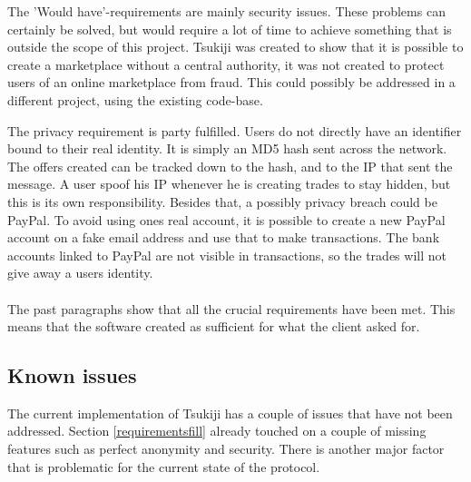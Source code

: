 The 'Would have'-requirements are mainly security issues.
These problems can certainly be solved, but would require a lot of time to achieve something that is outside the scope of this project.
Tsukiji was created to show that it is possible to create a marketplace without a central authority, it was not created to protect users of an online marketplace from fraud.
This could possibly be addressed in a different project, using the existing code-base.

The privacy requirement is party fulfilled. Users do not directly have an identifier bound to their real identity.
It is simply an MD5 hash sent across the network.
The offers created can be tracked down to the hash, and to the IP that sent the message.
A user spoof his IP whenever he is creating trades to stay hidden, but this is its own responsibility.
Besides that, a possibly privacy breach could be PayPal.
To avoid using ones real account, it is possible to create a new PayPal account on a fake email address and use that to make transactions.
The bank accounts linked to PayPal are not visible in transactions, so the trades will not give away a users identity.\\
\\
The past paragraphs show that all the crucial requirements have been met.
This means that the software created as sufficient for what the client asked for.

\subsection{Known issues}
\label{knownissues}
The current implementation of Tsukiji has a couple of issues that have not been addressed.
Section \ref{requirementsfill} already touched on a couple of missing features such as perfect anonymity and security.
There is another major factor that is problematic for the current state of the protocol.

